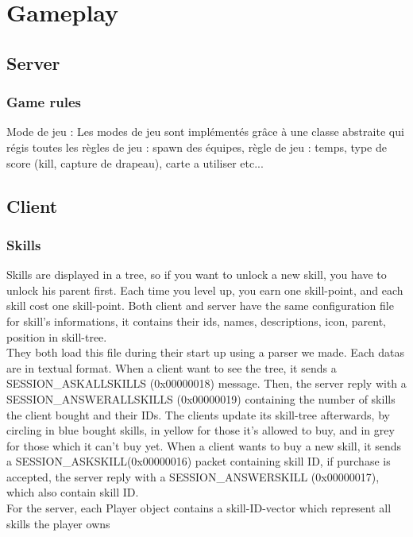 \documentclass{scrreprt}
\begin{document}
		\section{Gameplay}
		\subsection{Server}
		\subsubsection{Game rules}
		Mode de jeu :
		Les modes de jeu sont implémentés grâce à une classe abstraite qui régis toutes les règles de jeu : spawn des équipes, règle de jeu : temps, type de score (kill, capture de drapeau), carte a utiliser etc...
		\subsection{Client}
		\subsubsection{Skills}
		Skills are displayed in a tree, so if you want to unlock a new skill, you have to unlock his parent first. Each time you level up, you earn one skill-point, and each skill cost one skill-point. Both client and server have the same configuration file for skill's informations, it contains their ids, names, descriptions, icon, parent, position in skill-tree.\\

		They both load this file during their start up using a parser we made. Each datas are in textual format. When a client want to see the tree, it sends a SESSION\_ASKALLSKILLS (0x00000018) message. Then, the server reply with a SESSION\_ANSWERALLSKILLS (0x00000019) containing the number of skills the client bought and their IDs. The clients update its skill-tree afterwards, by circling in blue bought skills, in yellow for those it's allowed to buy, and in grey for those which it can't buy yet.
		When a client wants to buy a new skill, it sends a SESSION\_ASKSKILL(0x00000016) packet containing skill ID, if purchase is accepted, the server reply with a SESSION\_ANSWERSKILL (0x00000017), which also contain skill ID.\\

		For the server, each Player object contains a skill-ID-vector which represent all skills the player owns %
\end{document}
